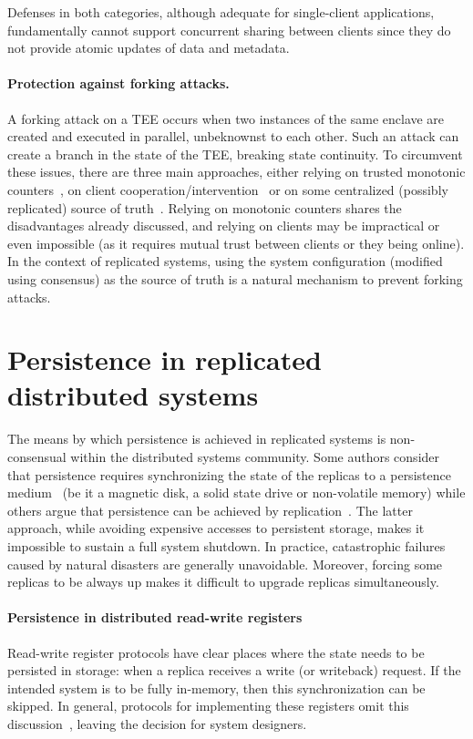 Defenses in both categories, although adequate for single-client
applications, fundamentally cannot support concurrent sharing
between clients since they do not provide atomic updates of data
and metadata.

\paragraph{Protection against forking attacks.}
A forking attack on a TEE occurs when two instances of the same
enclave are created and executed in parallel, unbeknownst to each
other. Such an attack can create a branch in the state of the
TEE, breaking state continuity. To circumvent these issues, there
are three main approaches, either relying on trusted monotonic
counters~\cite{rote,ariadne,a2m,trinc,memoir},  on client
cooperation/intervention~\cite{fork_verify,fork_fail,fork_comm,fork_lcm,fork_sporc,fork_fs,fork_venus}
or  on some centralized (possibly replicated) source of
truth~\cite{haven}. Relying on monotonic counters shares the
disadvantages already discussed, and relying on clients may be
impractical or even impossible (as it requires mutual trust
between clients or they being online). In the context of
replicated systems, using the system configuration (modified
using consensus) as the source of truth is a natural mechanism to
prevent forking attacks.

\section{Persistence in replicated distributed systems}

The means by which persistence is achieved in replicated
systems is non-consensual within the distributed systems
community. Some authors consider that persistence requires
synchronizing the state of the replicas to a persistence
medium~\cite{gaios} (be it a magnetic disk, a solid state drive or non-volatile
memory) while others argue that persistence can be achieved by
replication~\cite{pbft,byz_fault_tolerant,hq,zyzzyva}. The latter approach, while avoiding expensive
accesses to persistent storage, makes it impossible to sustain a
full system shutdown. In practice, catastrophic failures
caused by natural disasters are generally unavoidable.
Moreover, forcing some replicas to be always up
makes it difficult to upgrade replicas simultaneously.

\paragraph{Persistence in distributed read-write registers}
Read-write register protocols have clear places where the state
needs to be persisted in storage: when a replica receives a write
(or writeback) request.  If the intended system is to be fully
in-memory, then this synchronization can be skipped. In general,
protocols for implementing these registers omit this
discussion~\cite{abd,time_efficient_abd}, leaving the decision
for system designers.

